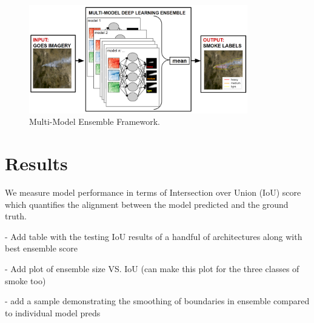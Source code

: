 \documentclass{article}
\begin{document}
\begin{figure}[h]
    \centering
    \includegraphics[width=0.85\textwidth]{ensemble_framework.png}
    \caption{Multi-Model Ensemble Framework.}
    \label{fig:ensemble_framework}
\end{figure}


\section{Results}
We measure model performance in terms of Intersection over Union (IoU) score which quantifies the alignment between the model predicted and the ground truth. 

- Add table with the testing IoU results of a handful of architectures along with best ensemble score 

- Add plot of ensemble size VS. IoU (can make this plot for the three classes of smoke too)

- add a sample demonstrating the smoothing of boundaries in ensemble compared to individual model preds
\end{document}

